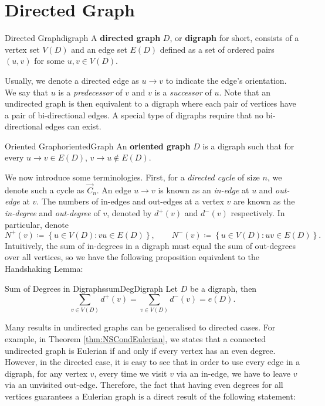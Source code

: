 \documentclass[math, code]{amznotes}
\theoremstyle{remark}
\begin{document}
\section{Directed Graph}
\begin{dfnbox}{Directed Graph}{digraph}
    A {\color{red} \textbf{directed graph}} $D$, or {\color{red} \textbf{digraph}} for short, consists of a vertex set $V(D)$ and an edge set $E(D)$ defined as a set of ordered pairs $(u, v)$ for some $u, v \in V(D)$.
\end{dfnbox}
Usually, we denote a directed edge as $u \to v$ to indicate the edge's orientation. We say that $u$ is a \textit{predecessor} of $v$ and $v$ is a \textit{successor} of $u$. Note that an undirected graph is then equivalent to a digraph where each pair of vertices have a pair of bi-directional edges. A special type of digraphs require that no bi-directional edges can exist.
\begin{dfnbox}{Oriented Graph}{orientedGraph}
    An {\color{red} \textbf{oriented graph}} $D$ is a digraph such that for every $u \to v \in E(D)$, $v \to u \notin E(D)$.
\end{dfnbox}
We now introduce some terminologies. First, for a \textit{directed cycle} of size $n$, we denote such a cycle as $\overrightarrow{C}_n$. An edge $u \to v$ is known as an \textit{in-edge} at $u$ and \textit{out-edge} at $v$. The numbers of in-edges and out-edges at a vertex $v$ are known as the \textit{in-degree} and \textit{out-degree} of $v$, denoted by $d^+(v)$ and $d^-(v)$ respectively. In particular, denote 
\begin{equation*}
    N^+(v) \coloneqq \left\{u \in V(D) \colon vu \in E(D)\right\}, \qquad N^-(v) \coloneqq \left\{u \in V(D) \colon uv \in E(D)\right\}.
\end{equation*}
Intuitively, the sum of in-degrees in a digraph must equal the sum of out-degrees over all vertices, so we have the following proposition equivalent to the Handshaking Lemma:
\begin{probox}{Sum of Degrees in Digraphs}{sumDegDigraph}
    Let $D$ be a digraph, then 
    \begin{equation*}
        \sum_{v \in V(D)}d^+(v) = \sum_{v \in V(D)}d^-(v) = e(D).
    \end{equation*}
\end{probox}
Many results in undirected graphs can be generalised to directed cases. For example, in Theorem \ref{thm:NSCondEulerian}, we states that a connected undirected graph is Eulerian if and only if every vertex has an even degree. However, in the directed case, it is easy to see that in order to use every edge in a digraph, for any vertex $v$, every time we visit $v$ via an in-edge, we have to leave $v$ via an unvisited out-edge. Therefore, the fact that having even degrees for all vertices guarantees a Eulerian graph is a direct result of the following statement:
\end{document}
